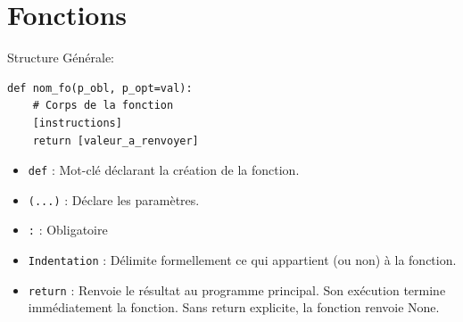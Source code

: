 \section{Fonctions}
Structure Générale:

\begin{verbatim}
def nom_fo(p_obl, p_opt=val):
    # Corps de la fonction
    [instructions]
    return [valeur_a_renvoyer]
\end{verbatim}

\begin{itemize}
\item \texttt{def} : Mot-clé déclarant la création de la fonction.
\item \texttt{(...)} : Déclare les paramètres.
\item \texttt{:} : Obligatoire
\item \texttt{Indentation} : Délimite formellement ce qui appartient (ou non) à la fonction.
\item \texttt{return} : Renvoie le résultat au programme principal. Son exécution termine immédiatement la fonction. Sans return explicite, la fonction renvoie None.
\end{itemize}